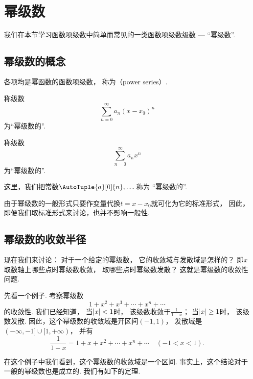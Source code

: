 \section{幂级数}
我们在本节学习函数项级数中简单而常见的一类函数项级数级数 --- “幂级数”.

\subsection{幂级数的概念}
\begin{definition}\label{definition:无穷级数.幂级数}
各项均是幂函数的函数项级数，
称为（power series）.

称级数\[
	\sum_{n=0}^\infty a_n (x-x_0)^n
\]为“幂级数的”.

称级数\[
	\sum_{n=0}^\infty a_n x^n
\]为“幂级数的”.

这里，我们把常数\(\AutoTuple{a}[0]{n},\dotsc\)称为
“幂级数的”.
\end{definition}

由于幂级数的一般形式只要作变量代换\(t = x - x_0\)就可化为它的标准形式，
因此，即便我们取标准形式来讨论，也并不影响一般性.

\subsection{幂级数的收敛半径}
现在我们来讨论：
对于一个给定的幂级数，
它的收敛域与发散域是怎样的？
即\(x\)取数轴上哪些点时幂级数收敛，
取哪些点时幂级数发散？
这就是幂级数的收敛性问题.

先看一个例子.
考察幂级数\[
	1+x^2+x^3+\dotsb+x^n+\dotsb
\]的收敛性.
我们已经知道，
当\(\abs{x}<1\)时，
该级数收敛于\(\frac{1}{1-x}\)；
当\(\abs{x}\geq1\)时，
该级数发散.
因此，这个幂级数的收敛域是开区间\((-1,1)\)，
发散域是\((-\infty,-1]\cup[1,+\infty)\)，
并有\[
	\frac{1}{1-x} = 1+x+x^2+\dotsb+x^n+\dotsb
	\quad(-1<x<1).
\]

在这个例子中我们看到，这个幂级数的收敛域是一个区间.
事实上，这个结论对于一般的幂级数也是成立的.
我们有如下的定理.

